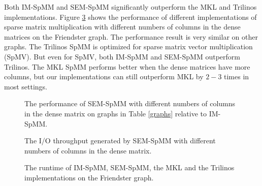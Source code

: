 Both IM-SpMM and SEM-SpMM significantly outperform the MKL and Trilinos implementations.
Figure \ref{perf:spmm} shows the performance of different implementations of
sparse matrix multiplication with different numbers of columns in the dense
matrices on the Friendster graph. The performance result is very similar
on other graphs. The Trilinos SpMM is optimized for sparse matrix vector
multiplication (SpMV). But even for SpMV, both IM-SpMM and SEM-SpMM outperform
Trilinos. The MKL SpMM performs better when the dense matrices have more columns,
but our implementations can still outperform MKL by $2-3$ times in most settings.

\begin{figure}
	\begin{center}
		\footnotesize
		
		\caption{The performance of SEM-SpMM with different numbers of columns
			in the dense matrix on graphs in Table \ref{graphs} relative to IM-SpMM.}
		\label{perf:spmm_comp}
	\end{center}
\end{figure}

\begin{figure}
	\begin{center}
		\footnotesize
		
		\caption{The I/O throughput generated by SEM-SpMM with different numbers of
		columns in the dense matrix.}
		\label{perf:spmm_IO}
	\end{center}
\end{figure}

\begin{figure}
	\begin{center}
		\footnotesize
		
		\caption{The runtime of IM-SpMM, SEM-SpMM, the MKL and the Trilinos
			implementations on the Friendster graph.}
		\label{perf:spmm}
	\end{center}
\end{figure}

%	
%	

